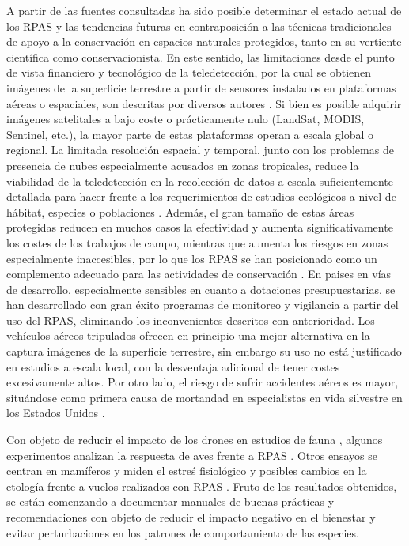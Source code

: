 \documentclass[11pt,]{article}
\begin{document}
A partir de las fuentes consultadas ha sido posible determinar el estado
actual de los RPAS y las tendencias futuras en contraposición a las
técnicas tradicionales de apoyo a la conservación en espacios naturales
protegidos, tanto en su vertiente científica como conservacionista. En
este sentido, las limitaciones desde el punto de vista financiero y
tecnológico de la teledetección, por la cual se obtienen imágenes de la
superficie terrestre a partir de sensores instalados en plataformas
aéreas o espaciales, son descritas por diversos autores \citep{Koh2012}.
Si bien es posible adquirir imágenes satelitales a bajo coste o
prácticamente nulo (LandSat, MODIS, Sentinel, etc.), la mayor parte de
estas plataformas operan a escala global o regional. La limitada
resolución espacial y temporal, junto con los problemas de presencia de
nubes especialmente acusados en zonas tropicales, reduce la viabilidad
de la teledetección en la recolección de datos a escala suficientemente
detallada para hacer frente a los requerimientos de estudios ecológicos
a nivel de hábitat, especies o poblaciones \citep{Wulder2004}. Además,
el gran tamaño de estas áreas protegidas reducen en muchos casos la
efectividad y aumenta significativamente los costes de los trabajos de
campo, mientras que aumenta los riesgos en zonas especialmente
inaccesibles, por lo que los RPAS se han posicionado como un complemento
adecuado para las actividades de conservación \citep{Zahawi2015}. En
paises en vías de desarrollo, especialmente sensibles en cuanto a
dotaciones presupuestarias, se han desarrollado con gran éxito programas
de monitoreo y vigilancia a partir del uso del RPAS, eliminando los
inconvenientes descritos con anterioridad. Los vehículos aéreos
tripulados ofrecen en principio una mejor alternativa en la captura
imágenes de la superficie terrestre, sin embargo su uso no está
justificado en estudios a escala local, con la desventaja adicional de
tener costes excesivamente altos. Por otro lado, el riesgo de sufrir
accidentes aéreos es mayor, situándose como primera causa de mortandad
en especialistas en vida silvestre en los Estados Unidos
\citep{Sasse2003}.

Con objeto de reducir el impacto de los drones en estudios de fauna ,
algunos experimentos analizan la respuesta de aves frente a RPAS
\citep{Vas2015}. Otros ensayos se centran en mamíferos y miden el estreś
fisiológico y posibles cambios en la etología frente a vuelos realizados
con RPAS \citep{Ditmer2015}. Fruto de los resultados obtenidos, se están
comenzando a documentar manuales de buenas prácticas y recomendaciones
con objeto de reducir el impacto negativo en el bienestar y evitar
perturbaciones en los patrones de comportamiento de las especies.
\end{document}
